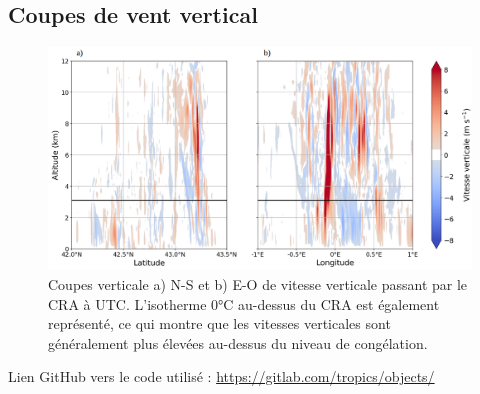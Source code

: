 \documentclass[12pt]{article}
\begin{document}
\subsection{Coupes de vent vertical}
\label{sec:secwt}

\begin{figure}[H]
    \centering
    \includegraphics[width=0.9\linewidth]{Figures/vertical_wt_slice.png}
    \caption{Coupes verticale a) N-S et b) E-O de vitesse verticale passant par le CRA à \protect{} UTC. L'isotherme 0°C au-dessus du CRA  est également représenté, ce qui montre que les vitesses verticales sont généralement plus élevées au-dessus du niveau de congélation.}
    \label{fig:wt_slice}
\end{figure}

\newpage    
\nocite{*}
\printbibliography[title = {Références}]

\noindent Lien GitHub vers le code utilisé : \url{https://gitlab.com/tropics/objects/}
\end{document}

